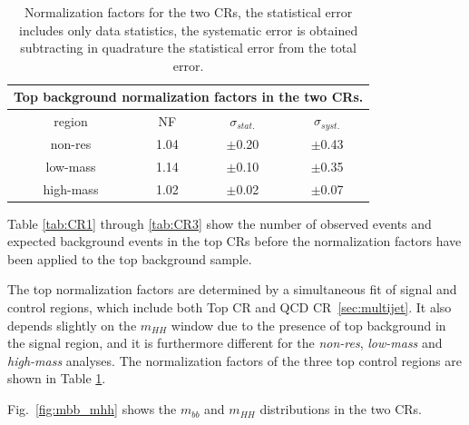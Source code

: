 \begin{table}
\begin{center}
\begin{tabular}{c|c|c|c}
\multicolumn{4}{c}{Top background normalization factors in the two
  CRs.} \\
\hline
region & NF & $\sigma_{stat.}$ & $\sigma_{syst.}$ \\
\hline
non-res   & 1.04  &  $\pm$0.20  &  $\pm$0.43\\
low-mass  & 1.14  &  $\pm$0.10  &  $\pm$0.35\\
high-mass & 1.02  &  $\pm$0.02  &  $\pm$0.07\\
\hline
\end{tabular}
\caption[Normalization factors for the two CRs]{Normalization factors for the two CRs, the statistical error
  includes only data statistics, the systematic error is obtained
  subtracting in quadrature the statistical error from the total error.} \label{tab:NFs}
\end{center}
\end{table}

Table \ref{tab:CR1} through \ref{tab:CR3} show the number of observed
events and expected background events in the top CRs before the
normalization factors have been applied to the top background sample.

The top normalization factors are determined by a simultaneous fit  of
signal and control regions, which include both Top CR and QCD CR~\ref{sec:multijet}. It also depends slightly on the $m_{HH}$ window due to the presence of top background in the signal region, and it is furthermore different for the \emph{non-res}, \emph{low-mass} and \emph{high-mass} analyses. The normalization
factors of the three top control regions are shown in Table \ref{tab:NFs}.

Fig.~\ref{fig:mbb_mhh} shows the $m_{bb}$ and $m_{HH}$ distributions in the two CRs.%


